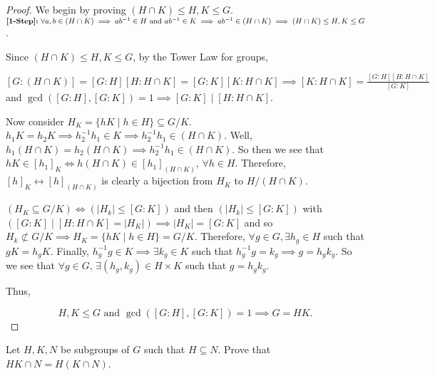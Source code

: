 \documentclass[addpoints,10pt]{exam}
\theoremstyle{plain}
\theoremstyle{definition}
\newtheorem{prob}[thm]{Problem}
\theoremstyle{plain}
\theoremstyle{plain}
\theoremstyle{definition}
\let\oldprob\prob
\let\endoldprob\endprob
\renewenvironment{prob}
  {\begin{singlespace}\oldprob}
  {\endoldprob\end{singlespace}}
\newcommand{\belowtitle}{\leavevmode\newline}
\newcommand{\Observe}{\text{Observe.}}
\begin{document}
\begin{proof}
  We begin by proving $(H\cap K)\leq H,K\leq G$.\belowtitle
  $\textbf{[1-Step]:\;}\forall a,b\in (H\cap K)\implies ab^{-1}\in H\text{ and }ab^{-1}\in K\implies ab^{-1}\in (H\cap K)\implies (H\cap K)\leq H,K\leq G$.

  Since $(H\cap K)\leq H,K \leq G$, by the Tower Law for groups,
  \begin{center}
    $[G:(H\cap K)]=[G:H][H:H\cap K]=[G:K][K:H\cap K]\implies [K:H\cap K]=\frac{[G:H][H:H\cap K]}{[G:K]}$\newline
    and $\gcd([G:H],[G:K])=1\implies [G:K]\mid [H:H\cap K]$.
  \end{center}

  Now consider $H_{K}=\{hK\mid h\in H\}\subseteq G/K$. $h_{1}K=h_{2}K\implies h_{2}^{-1}h_{1}\in K\implies h_{2}^{-1}h_{1}\in (H\cap K).$ Well, $h_{1}(H\cap K)=h_{2}(H\cap K)\implies h_{2}^{-1}h_{1}\in (H\cap K)$. So then we see that $hK\in [h_{1}]_{K}\iff h(H\cap K)\in [h_{1}]_{(H\cap K)},\,\forall h\in H.$ Therefore, $[h]_{K}\leftrightarrow [h]_{(H\cap K)}$ is clearly a bijection from $H_{K}$ to $H/(H\cap K)$. \Observe

  $(H_{K}\subseteq G/K)\iff (|H_{k}|\leq [G:K])$ and then $(|H_{k}|\leq [G:K])$ with $([G:K]\mid [H:H\cap K]=|H_{K}|)\implies |H_{K}|=[G:K]$ and so $H_{k}\not\subset G/K\implies H_{K}=\{hK\mid h\in H\}=G/K.$ Therefore, $\forall g\in G,\exists h_{g}\in H$ such that $gK=h_{g}K$. Finally, $h_{g}^{-1}g\in K\implies \exists k_{g}\in K$ such that $h_{g}^{-1}g=k_{g}\implies g=h_{g}k_{g}$. So we see that $\forall g\in G,\,\exists (h_{g},k_{g})\in H\times K$ such that $g=h_{g}k_{g}$.

  Thus,

  $$H,K\leq G\text{ and }\gcd([G:H],[G:K])=1\implies G=HK.$$

\end{proof}
\newpage
\begin{prob}
  Let $H,K,N$ be subgroups of $G$ such that $H\subseteq N$. Prove that $HK\cap N = H(K\cap N)$.
\end{prob}
\end{document}
